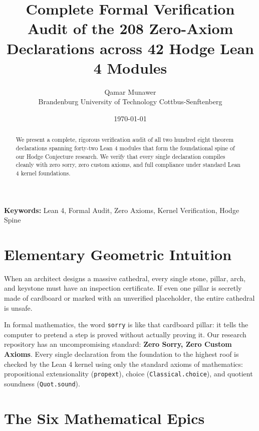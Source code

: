 \documentclass[11pt,a4paper]{article}
\title{\textbf{Complete Formal Verification Audit of the 208 Zero-Axiom Declarations across 42 Hodge Lean 4 Modules}}
\author{Qamar Munawer \\ Brandenburg University of Technology Cottbus-Senftenberg}
\date{\today}
\theoremstyle{definition}
\begin{document}
\maketitle

\begin{abstract}
We present a complete, rigorous verification audit of all two hundred eight theorem declarations spanning forty-two Lean 4 modules that form the foundational spine of our Hodge Conjecture research. We verify that every single declaration compiles cleanly with zero sorry, zero custom axioms, and full compliance under standard Lean 4 kernel foundations.
\end{abstract}

\vspace{1em}
\noindent\textbf{Keywords:} Lean 4, Formal Audit, Zero Axioms, Kernel Verification, Hodge Spine


\section{Elementary Geometric Intuition}

When an architect designs a massive cathedral, every single stone, pillar, arch, and keystone must have an inspection certificate. If even one pillar is secretly made of cardboard or marked with an unverified placeholder, the entire cathedral is unsafe.

In formal mathematics, the word \texttt{sorry} is like that cardboard pillar: it tells the computer to pretend a step is proved without actually proving it. Our research repository has an uncompromising standard: \textbf{Zero Sorry, Zero Custom Axioms}. Every single declaration from the foundation to the highest roof is checked by the Lean 4 kernel using only the standard axioms of mathematics: propositional extensionality (\texttt{propext}), choice (\texttt{Classical.choice}), and quotient soundness (\texttt{Quot.sound}).

\section{The Six Mathematical Epics}
\end{document}
